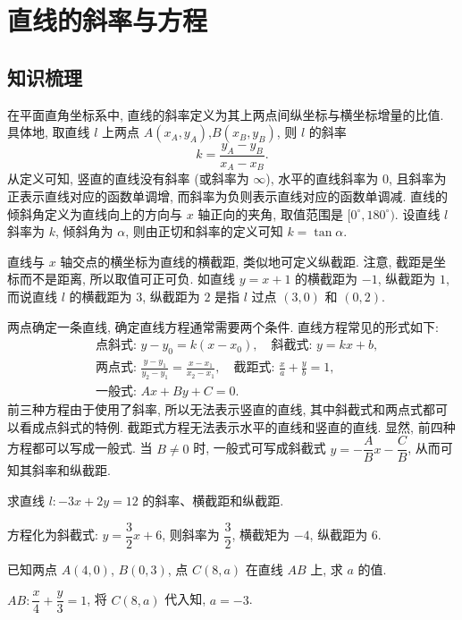 
\section{直线的斜率与方程}

\subsection{知识梳理}
在平面直角坐标系中, 直线的斜率定义为其上两点间纵坐标与横坐标增量的比值. 具体地, 取直线 $l$ 上两点 $A(x_A,y_A)$,$B(x_B,y_B)$, 则 $l$ 的斜率 
\[k=\dfrac{y_A-y_B}{x_A-x_B}.\]
从定义可知, 竖直的直线没有斜率 (或斜率为 $\infty$), 水平的直线斜率为 $0$, 且斜率为正表示直线对应的函数单调增, 而斜率为负则表示直线对应的函数单调减. 直线的倾斜角定义为直线向上的方向与 $x$ 轴正向的夹角, 取值范围是 $[0^\circ,180^\circ)$. 设直线 $l$ 斜率为 $k$, 倾斜角为 $\alpha$, 则由正切和斜率的定义可知 $k=\tan\alpha$.

直线与 $x$ 轴交点的横坐标为直线的横截距, 类似地可定义纵截距. 注意, 截距是坐标而不是距离, 所以取值可正可负. 如直线 $y=x+1$ 的横截距为 $-1$, 纵截距为 $1$, 而说直线 $l$ 的横截距为 $3$, 纵截距为 $2$ 是指 $l$ 过点 $(3,0)$ 和 $(0,2)$.

两点确定一条直线, 确定直线方程通常需要两个条件. 直线方程常见的形式如下:
\[\begin{aligned}
    &\text{点斜式:\ }y-y_0=k(x-x_0),\quad
     \text{斜截式:\ }y=kx+b,   \\
    &\text{两点式:\ }\frac{y-y_1}{y_2-y_1}= \frac{x-x_1}{x_2-x_1},\quad
     \text{截距式:\ }\frac{x}{a}+ \frac{y}{b}= 1,\\
    &\text{一般式:\ }Ax+By+C=0.
\end{aligned}\]
前三种方程由于使用了斜率, 所以无法表示竖直的直线, 其中斜截式和两点式都可以看成点斜式的特例. 截距式方程无法表示水平的直线和竖直的直线. 显然, 前四种方程都可以写成一般式. 当 $B\neq0$ 时, 一般式可写成斜截式 $y=-\dfrac{A}{B}x-\dfrac{C}B$, 从而可知其斜率和纵截距.

\lianxi
\begin{exercise}
    求直线 $l\colon -3x+2y=12$ 的斜率、横截距和纵截距.
\end{exercise}
\beginsolution
    方程化为斜截式: $y= \dfrac32 x+6$, 则斜率为 $\dfrac32$, 横截矩为 $-4$, 纵截距为 $6$.
\endsolution

\begin{exercise}
    已知两点 $A(4, 0)$, $B(0, 3)$, 点 $C(8, a)$ 在直线 $AB$ 上, 求 $a$ 的值.
\end{exercise}
\beginsolution
    $AB\colon \dfrac{x}4+ \dfrac{y}3= 1$, 将 $C(8, a)$ 代入知, $a=-3$.
\endsolution

